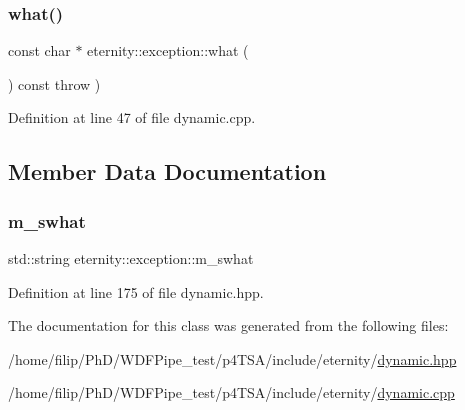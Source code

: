 \subsubsection{\texorpdfstring{what()}{what()}}
{\footnotesize\ttfamily const char $\ast$ eternity\+::exception\+::what (\begin{DoxyParamCaption}{ }\end{DoxyParamCaption}) const throw  ) \hspace{0.3cm}{\ttfamily [virtual]}}



Definition at line 47 of file dynamic.\+cpp.



\subsection{Member Data Documentation}
\mbox{\label{classeternity_1_1exception_ad3190da518fc2bb1dcc50fa665176036}} 
\subsubsection{\texorpdfstring{m\+\_\+swhat}{m\_swhat}}
{\footnotesize\ttfamily std\+::string eternity\+::exception\+::m\+\_\+swhat\hspace{0.3cm}{\ttfamily [protected]}}



Definition at line 175 of file dynamic.\+hpp.



The documentation for this class was generated from the following files\+:\begin{DoxyCompactItemize}
\item 
/home/filip/\+Ph\+D/\+W\+D\+F\+Pipe\+\_\+test/p4\+T\+S\+A/include/eternity/\hyperlink{dynamic_8hpp}{dynamic.\+hpp}\item 
/home/filip/\+Ph\+D/\+W\+D\+F\+Pipe\+\_\+test/p4\+T\+S\+A/include/eternity/\hyperlink{dynamic_8cpp}{dynamic.\+cpp}\end{DoxyCompactItemize}
